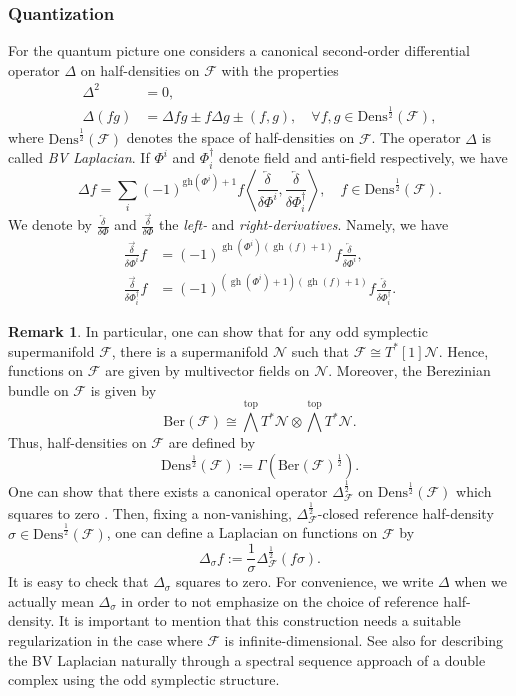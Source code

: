 \documentclass[11pt,colorinlistoftodos]{amsart}
\numberwithin{equation}{subsection}
\theoremstyle{plain}
\theoremstyle{definition}
\newtheorem{rem}[thm]{Remark}
\theoremstyle{remark}
\DeclareMathOperator{\gh}{gh}
\newcommand{\calF}{\mathcal{F}}
\newcommand{\calN}{\mathcal{N}}
\begin{document}
\subsubsection{Quantization} For the quantum picture one considers a canonical second-order differential operator $\Delta$ on half-densities on $\calF$ with the properties
\begin{align}
    \Delta^2&=0,\\
    \Delta(fg)&=\Delta f g\pm f\Delta g\pm (f,g),\quad \forall f,g\in \mathrm{Dens}^{\frac{1}{2}}(\calF),
\end{align}
where $\mathrm{Dens}^{\frac{1}{2}}(\calF)$ denotes the space of half-densities on $\calF$. The operator $\Delta$ is called \emph{BV Laplacian}. If $\Phi^i$ and $\Phi^\dagger_i$ denote field and anti-field respectively, we have 
\[
\Delta f=\sum_{i}(-1)^{\mathrm{gh}(\Phi^i)+1}f\left\langle \frac{\overleftarrow{\delta}}{\delta \Phi^i},\frac{\overleftarrow{\delta}}{\delta \Phi^\dagger_i}\right\rangle, \quad f\in \mathrm{Dens}^{\frac{1}{2}}(\calF).
\]
We denote by $\frac{\overleftarrow{\delta}}{\delta\Phi}$ and $\frac{\overrightarrow{\delta}}{\delta\Phi}$ the \emph{left-} and \emph{right-derivatives}. Namely, we have 
\begin{align*}
    \frac{\overrightarrow{\delta}}{\delta\Phi^i}f&=(-1)^{\gh(\Phi^i)(\gh(f)+1)}f\frac{\overleftarrow{\delta}}{\delta\Phi^i},\\
    \frac{\overrightarrow{\delta}}{\delta\Phi^\dagger_i}f&=(-1)^{(\gh(\Phi^i)+1)(\gh(f)+1)}f\frac{\overleftarrow{\delta}}{\delta\Phi^\dagger_i}.
\end{align*}
\begin{rem}
In particular, one can show that for any odd symplectic supermanifold $\calF$, there is a supermanifold $\calN$ such that $\calF\cong T^*[1]\calN$. Hence, functions on $\calF$ are given by multivector fields on $\calN$. Moreover, the Berezinian bundle on $\calF$ is given by 
\[
\mathrm{Ber}(\calF)\cong \bigwedge^\mathrm{top}T^*\calN\otimes \bigwedge^\mathrm{top}T^*\calN.
\]
Thus, half-densities on $\calF$ are defined by 
\[
\mathrm{Dens}^\frac{1}{2}(\calF):=\Gamma\left(\mathrm{Ber}(\calF)^\frac{1}{2}\right).
\]
One can show that there exists a canonical operator $\Delta^\frac{1}{2}_\calF$ on $\mathrm{Dens}^\frac{1}{2}(\calF)$ which squares to zero \cite{Khudaverdian2004}. Then, fixing a non-vanishing, $\Delta^\frac{1}{2}_\calF$-closed reference half-density $\sigma\in\mathrm{Dens}^\frac{1}{2}(\calF)$, one can define a Laplacian on functions on $\calF$ by 
\begin{equation}
\label{eq:twisting_BV_Laplacian}
\Delta_\sigma f:=\frac{1}{\sigma}\Delta^\frac{1}{2}_\calF(f\sigma).
\end{equation}
It is easy to check that $\Delta_\sigma$ squares to zero. For convenience, we write $\Delta$ when we actually mean $\Delta_\sigma$ in order to not emphasize on the choice of reference half-density. It is important to mention that this construction needs a suitable regularization in the case where $\calF$ is infinite-dimensional. See also \cite{Severa2006} for describing the BV Laplacian naturally through a spectral sequence approach of a double complex using the odd symplectic structure.
\end{rem}
\end{document}
